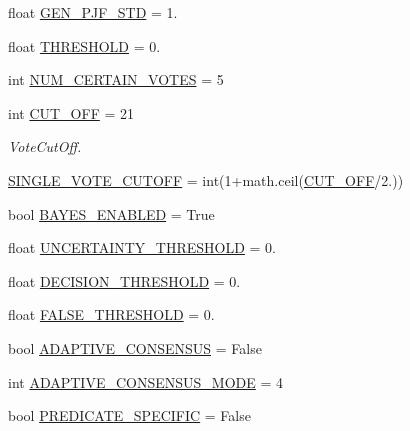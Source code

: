\begin{DoxyCompactItemize}
\item 
float \hyperlink{namespacedynamicfilterapp_1_1toggles_a338b6adc65ae090cdfc238116e9d028b}{G\+E\+N\+\_\+\+P\+J\+F\+\_\+\+S\+TD} = 1.
\item 
float \hyperlink{namespacedynamicfilterapp_1_1toggles_aa4a5babd6a47f588b10406827346b66f}{T\+H\+R\+E\+S\+H\+O\+LD} = 0.
\item 
int \hyperlink{namespacedynamicfilterapp_1_1toggles_a157bc167f366f75c9ba8d3e36e8d8540}{N\+U\+M\+\_\+\+C\+E\+R\+T\+A\+I\+N\+\_\+\+V\+O\+T\+ES} = 5
\item 
int \hyperlink{namespacedynamicfilterapp_1_1toggles_a914791c176a78c026dc76a18bcd88d73}{C\+U\+T\+\_\+\+O\+FF} = 21
\begin{DoxyCompactList}\small\item\em Vote\+Cut\+Off. \end{DoxyCompactList}\item 
\hyperlink{namespacedynamicfilterapp_1_1toggles_afa8e106b735033b706b1412e12f6783b}{S\+I\+N\+G\+L\+E\+\_\+\+V\+O\+T\+E\+\_\+\+C\+U\+T\+O\+FF} = int(1+math.\+ceil(\hyperlink{namespacedynamicfilterapp_1_1toggles_a914791c176a78c026dc76a18bcd88d73}{C\+U\+T\+\_\+\+O\+FF}/2.))
\item 
bool \hyperlink{namespacedynamicfilterapp_1_1toggles_adadcb301c2f0066591eaf0a4c08ac96d}{B\+A\+Y\+E\+S\+\_\+\+E\+N\+A\+B\+L\+ED} = True
\item 
float \hyperlink{namespacedynamicfilterapp_1_1toggles_aaefdc27b85545eb4a910f5c65f7d8bbb}{U\+N\+C\+E\+R\+T\+A\+I\+N\+T\+Y\+\_\+\+T\+H\+R\+E\+S\+H\+O\+LD} = 0.
\item 
float \hyperlink{namespacedynamicfilterapp_1_1toggles_ac4442b6c569574253ef445d09952d3f0}{D\+E\+C\+I\+S\+I\+O\+N\+\_\+\+T\+H\+R\+E\+S\+H\+O\+LD} = 0.
\item 
float \hyperlink{namespacedynamicfilterapp_1_1toggles_a31317fa26792fa204392549329cc31cb}{F\+A\+L\+S\+E\+\_\+\+T\+H\+R\+E\+S\+H\+O\+LD} = 0.
\item 
bool \hyperlink{namespacedynamicfilterapp_1_1toggles_a7b6800fe9bb5df8c84060ed96d9711ac}{A\+D\+A\+P\+T\+I\+V\+E\+\_\+\+C\+O\+N\+S\+E\+N\+S\+US} = False
\item 
int \hyperlink{namespacedynamicfilterapp_1_1toggles_a394fa3f8531c2ecc987f982367a4af2d}{A\+D\+A\+P\+T\+I\+V\+E\+\_\+\+C\+O\+N\+S\+E\+N\+S\+U\+S\+\_\+\+M\+O\+DE} = 4
\item 
bool \hyperlink{namespacedynamicfilterapp_1_1toggles_a2826a54e707f46fbd0fa2f8f6219ead7}{P\+R\+E\+D\+I\+C\+A\+T\+E\+\_\+\+S\+P\+E\+C\+I\+F\+IC} = False

\end{DoxyCompactItemize}
